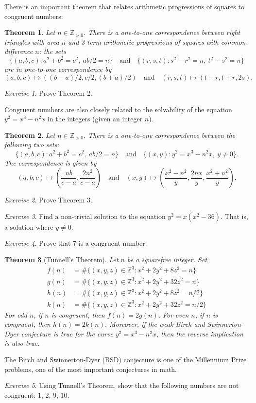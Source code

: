 \documentclass{article}
\newtheorem{theorem}{Theorem}%
\theoremstyle{definition}
\theoremstyle{remark}
\newtheorem{exercise}{Exercise}
\newcommand{\ZZ}{\mathbb{Z}}
\begin{document}
There is an important theorem that relates arithmetic progressions of squares to congruent numbers:

\begin{theorem}
	Let \(n\in\ZZ_{>0}\).
	There is a one-to-one correspondence between right triangles with area \(n\) and 3-term arithmetic progressions of squares with common difference \(n\): the sets
	\[\{(a,b,c):a^2+b^2=c^2,\ ab/2=n\}\quad\text{and}\quad\{(r,s,t):s^2-r^2=n,\ t^2-s^2=n\}\]
	are in one-to-one correspondence by
	\[(a,b,c)\longmapsto((b-a)/2,c/2,(b+a)/2)\quad\text{and}\quad(r,s,t)\longmapsto(t-r,t+r,2s).\]
\end{theorem}

\begin{exercise}
	Prove Theorem 2.
\end{exercise}

Congruent numbers are also closely related to the solvability of the equation \(y^2=x^3-n^2x\) in the integers (given an integer \(n\)).

\begin{theorem}
	Let \(n\in\ZZ_{>0}\).
	There is a one-to-one correspondence between the following two sets:
	\[\{(a,b,c):a^2+b^2=c^2,\ ab/2=n\}\quad\text{and}\quad\{(x,y):y^2=x^3-n^2x,\ y\neq 0\}.\]
	The correspondence is given by 
	\[(a,b,c)\longmapsto\left(\frac{nb}{c-a},\frac{2n^2}{c-a}\right)\quad\text{and}\quad(x,y)\mapsto\left(\frac{x^2-n^2}{y},\frac{2nx}{y},\frac{x^2+n^2}{y}\right).\]
\end{theorem}

\begin{exercise}
	Prove Theorem 3.
\end{exercise}

\begin{exercise}
	Find a non-trivial solution to the equation \(y^2=x(x^2-36)\).
	That is, a solution where \(y\neq 0\).
\end{exercise}

\begin{exercise}
	Prove that \(7\) is a congruent number.
\end{exercise}

\begin{theorem}[Tunnell's Theorem]
	Let \(n\) be a squarefree integer.
	Set
	\begin{align*}
		f(n) &= \#\{(x,y,z)\in\ZZ^3:x^2+2y^2+8z^2=n\}\\
		g(n) &= \#\{(x,y,z)\in\ZZ^3:x^2+2y^2+32z^2=n\}\\
		h(n) &= \#\{(x,y,z)\in\ZZ^3:x^2+2y^2+8z^2=n/2\}\\
		k(n) &= \#\{(x,y,z)\in\ZZ^3:x^2+2y^2+32z^2=n/2\}
	\end{align*}
	For odd \(n\), if \(n\) is congruent, then \(f(n)=2g(n)\).
	For even \(n\), if \(n\) is congruent, then \(h(n)=2k(n)\).
	Moreover, if the weak Birch and Swinnerton-Dyer conjecture is true for the curve \(y^2=x^3-n^2x\), then the reverse implication is also true.
\end{theorem}

The Birch and Swinnerton-Dyer (BSD) conjecture is one of the Millennium Prize problems, one of the most important conjectures in math.

\begin{exercise}
	Using Tunnell's Theorem, show that the following numbers are not congruent: 1, 2, 9, 10.
\end{exercise}
\end{document}
